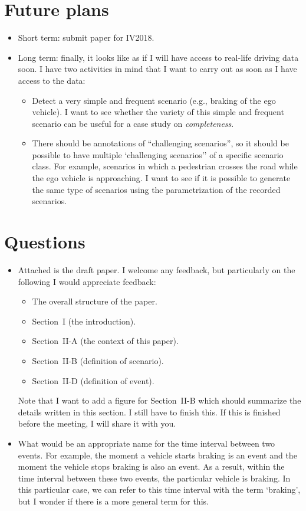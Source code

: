 \documentclass[10pt,final,a4paper,oneside,onecolumn]{article}
\begin{document}
\section{Future plans}

\begin{itemize}
	\item Short term: submit paper for IV2018.
	\item Long term: finally, it looks like as if I will have access to real-life driving data soon. I have two activities in mind that I want to carry out as soon as I have access to the data:
	\begin{itemize}
		\item Detect a very simple and frequent scenario (e.g., braking of the ego vehicle). I want to see whether the variety of this simple and frequent scenario can be useful for a case study on \emph{completeness}.
		\item There should be annotations of ``challenging scenarios'', so it should be possible to have multiple `challenging scenarios'' of a specific scenario class. For example, scenarios in which a pedestrian crosses the road while the ego vehicle is approaching. I want to see if it is possible to generate the same type of scenarios using the parametrization of the recorded scenarios.
	\end{itemize}
\end{itemize}

\section{Questions}

\begin{itemize}
	\item Attached is the draft paper. I welcome any feedback, but particularly on the following I would appreciate feedback:
	\begin{itemize}
		\item The overall structure of the paper.
		\item Section~I (the introduction).
		\item Section~II-A (the context of this paper).
		\item Section~II-B (definition of scenario).
		\item Section~II-D (definition of event).
	\end{itemize}
	Note that I want to add a figure for Section~II-B which should summarize the details written in this section. I still have to finish this. If this is finished before the meeting, I will share it with you.
	\item What would be an appropriate name for the time interval between two events. For example, the moment a vehicle starts braking is an event and the moment the vehicle stops braking is also an event. As a result, within the time interval between these two events, the particular vehicle is braking. In this particular case, we can refer to this time interval with the term `braking', but I wonder if there is a more general term for this. 
\end{itemize}

%
%


\end{document}
